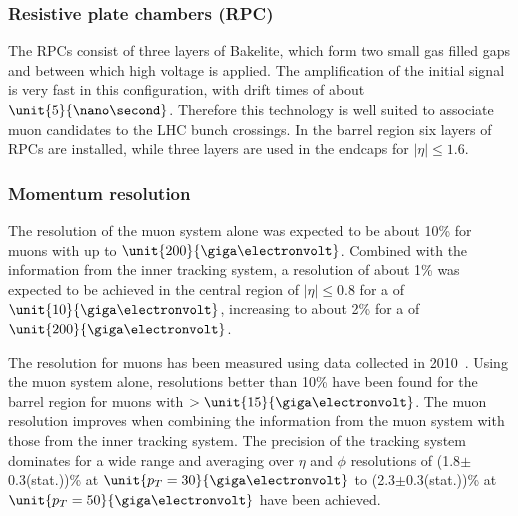 \subsubsection*{Resistive plate chambers (RPC)}
The RPCs consist of three layers of Bakelite, which form two small gas filled gaps and between which high voltage is applied. The amplification of the initial signal is very fast in this configuration, with drift times of about $\unit{5}{\nano\second}$. Therefore this technology is well suited to associate muon candidates to the LHC bunch crossings. In the barrel region six layers of RPCs are installed, while three layers are used in the endcaps for $\vert\eta\vert \leq 1.6$.
\subsubsection*{Momentum resolution}
The \pt resolution of the muon system alone was expected to be about 10\% for muons with \pt up to $\unit{200}{\giga\electronvolt}$. Combined with the information from the inner tracking system, a resolution of about 1\% was expected to be achieved in the central region of $\vert\eta\vert \leq 0.8$ for a \pt of $\unit{10}{\giga\electronvolt}$, increasing to about 2\% for a \pt of $\unit{200}{\giga\electronvolt}$.

The \pt resolution for muons has been measured using data collected in 2010~\cite{MUO-10-004}. Using the muon system alone, resolutions better than 10\% have been found for the barrel region for muons with \pt $> \unit{15}{\giga\electronvolt}$. The muon resolution improves when combining the information from the muon system with those from the inner tracking system. The precision of the tracking system dominates for a wide \pt range and averaging over $\eta$ and $\phi$ resolutions of (1.8$\pm$0.3(stat.))\% at $\unit{\pt = 30}{\giga\electronvolt}$ to (2.3$\pm$0.3(stat.))\% at $\unit{\pt = 50}{\giga\electronvolt}$ have been achieved.
